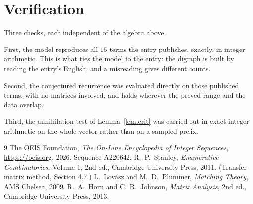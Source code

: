 \documentclass[11pt,a4paper]{article}
\theoremstyle{plain}
\theoremstyle{definition}
\begin{document}
\section{Verification}

Three checks, each independent of the algebra above.

First, the model reproduces all $15$ terms the entry publishes, exactly, in integer
arithmetic. This is what ties the model to the entry: the digraph is built by reading the
entry's English, and a misreading gives different counts.

Second, the conjectured recurrence was evaluated directly on those published terms, with no
matrices involved, and holds wherever the proved range and the data overlap.

Third, the annihilation test of Lemma~\ref{lem:crit} was carried out in exact integer
arithmetic on the whole vector rather than on a sampled prefix.

\begin{thebibliography}{9}
 The OEIS Foundation, \emph{The On-Line Encyclopedia of Integer
Sequences}, \url{https://oeis.org}, 2026. Sequence A220642.
 R.~P.~Stanley, \emph{Enumerative Combinatorics}, Volume 1, 2nd ed.,
Cambridge University Press, 2011. (Transfer-matrix method, Section 4.7.)
 L.~Lov\'asz and M.~D.~Plummer, \emph{Matching Theory}, AMS Chelsea,
2009.
 R.~A.~Horn and C.~R.~Johnson, \emph{Matrix Analysis}, 2nd ed., Cambridge
University Press, 2013.
\end{thebibliography}
\end{document}
